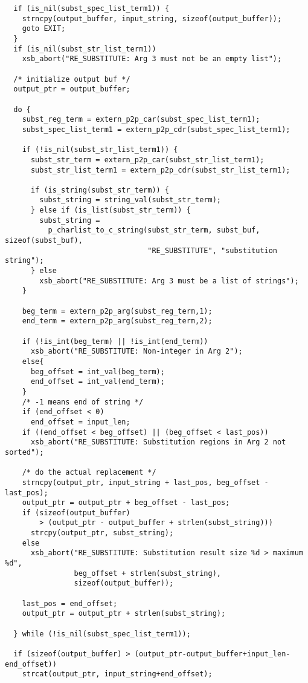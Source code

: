 {\begin{verbatim}
  if (is_nil(subst_spec_list_term1)) {
    strncpy(output_buffer, input_string, sizeof(output_buffer));
    goto EXIT;
  }
  if (is_nil(subst_str_list_term1))
    xsb_abort("RE_SUBSTITUTE: Arg 3 must not be an empty list");

  /* initialize output buf */
  output_ptr = output_buffer;

  do {
    subst_reg_term = extern_p2p_car(subst_spec_list_term1);
    subst_spec_list_term1 = extern_p2p_cdr(subst_spec_list_term1);

    if (!is_nil(subst_str_list_term1)) {
      subst_str_term = extern_p2p_car(subst_str_list_term1);
      subst_str_list_term1 = extern_p2p_cdr(subst_str_list_term1);

      if (is_string(subst_str_term)) {
        subst_string = string_val(subst_str_term);
      } else if (is_list(subst_str_term)) {
        subst_string =
          p_charlist_to_c_string(subst_str_term, subst_buf, sizeof(subst_buf),
                                 "RE_SUBSTITUTE", "substitution string");
      } else 
        xsb_abort("RE_SUBSTITUTE: Arg 3 must be a list of strings");
    }

    beg_term = extern_p2p_arg(subst_reg_term,1);
    end_term = extern_p2p_arg(subst_reg_term,2);

    if (!is_int(beg_term) || !is_int(end_term))
      xsb_abort("RE_SUBSTITUTE: Non-integer in Arg 2");
    else{
      beg_offset = int_val(beg_term);
      end_offset = int_val(end_term);
    }
    /* -1 means end of string */
    if (end_offset < 0)
      end_offset = input_len;
    if ((end_offset < beg_offset) || (beg_offset < last_pos))
      xsb_abort("RE_SUBSTITUTE: Substitution regions in Arg 2 not sorted");

    /* do the actual replacement */
    strncpy(output_ptr, input_string + last_pos, beg_offset - last_pos);
    output_ptr = output_ptr + beg_offset - last_pos;
    if (sizeof(output_buffer)
        > (output_ptr - output_buffer + strlen(subst_string)))
      strcpy(output_ptr, subst_string);
    else
      xsb_abort("RE_SUBSTITUTE: Substitution result size %d > maximum %d",
                beg_offset + strlen(subst_string),
                sizeof(output_buffer));
    
    last_pos = end_offset;
    output_ptr = output_ptr + strlen(subst_string);

  } while (!is_nil(subst_spec_list_term1));

  if (sizeof(output_buffer) > (output_ptr-output_buffer+input_len-end_offset))
    strcat(output_ptr, input_string+end_offset);


\end{verbatim}}
